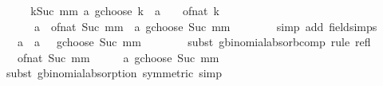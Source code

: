 \begin{isabellebody}
\ \ \isamarkupfalse%
\ \isamarkupfalse%
\ {\isachardoublequoteopen}{\isacharparenleft}{\kern0pt}{\isasymSum}k{\isasymle}Suc\ mm{\isachardot}{\kern0pt}\ {\isacharparenleft}{\kern0pt}a\ gchoose\ k{\isacharparenright}{\kern0pt}\ {\isacharasterisk}{\kern0pt}\ {\isacharparenleft}{\kern0pt}a\ {\isacharslash}{\kern0pt}\ {}\ {\isacharminus}{\kern0pt}\ of{\isacharunderscore}{\kern0pt}nat\ k{\isacharparenright}{\kern0pt}{\isacharparenright}{\kern0pt}\ {\isacharequal}{\kern0pt}\isanewline
\ \ \ \ \ \ {\isacharparenleft}{\kern0pt}a\ {\isacharminus}{\kern0pt}\ of{\isacharunderscore}{\kern0pt}nat\ {\isacharparenleft}{\kern0pt}Suc\ mm{\isacharparenright}{\kern0pt}{\isacharparenright}{\kern0pt}\ {\isacharasterisk}{\kern0pt}\ {\isacharparenleft}{\kern0pt}a\ gchoose\ Suc\ mm{\isacharparenright}{\kern0pt}\ {\isacharslash}{\kern0pt}\ {}{\isachardoublequoteclose}\isanewline
\ \ \ \ \isamarkupfalse%
\ {\isacharparenleft}{\kern0pt}simp\ add{\isacharcolon}{\kern0pt}\ field{\isacharunderscore}{\kern0pt}simps{\isacharparenright}{\kern0pt}\isanewline
\ \ \isamarkupfalse%
\ \isamarkupfalse%
\ {\isachardoublequoteopen}{\isasymdots}\ {\isacharequal}{\kern0pt}\ a\ {\isacharasterisk}{\kern0pt}\ {\isacharparenleft}{\kern0pt}a\ {\isacharminus}{\kern0pt}\ {}\ gchoose\ Suc\ mm{\isacharparenright}{\kern0pt}\ {\isacharslash}{\kern0pt}\ {}{\isachardoublequoteclose}\isanewline
\ \ \ \ \isamarkupfalse%
\ {\isacharparenleft}{\kern0pt}subst\ gbinomial{\isacharunderscore}{\kern0pt}absorb{\isacharunderscore}{\kern0pt}comp{\isacharparenright}{\kern0pt}\ {\isacharparenleft}{\kern0pt}rule\ refl{\isacharparenright}{\kern0pt}\isanewline
\ \ \isamarkupfalse%
\ \isamarkupfalse%
\ {\isachardoublequoteopen}{\isasymdots}\ {\isacharequal}{\kern0pt}\ {\isacharparenleft}{\kern0pt}of{\isacharunderscore}{\kern0pt}nat\ {\isacharparenleft}{\kern0pt}Suc\ mm{\isacharparenright}{\kern0pt}\ {\isacharplus}{\kern0pt}\ {}{\isacharparenright}{\kern0pt}\ {\isacharslash}{\kern0pt}\ {}\ {\isacharasterisk}{\kern0pt}\ {\isacharparenleft}{\kern0pt}a\ gchoose\ {\isacharparenleft}{\kern0pt}Suc\ mm\ {\isacharplus}{\kern0pt}\ {}{\isacharparenright}{\kern0pt}{\isacharparenright}{\kern0pt}{\isachardoublequoteclose}\isanewline
\ \ \ \ \isamarkupfalse%
\ {\isacharparenleft}{\kern0pt}subst\ gbinomial{\isacharunderscore}{\kern0pt}absorption\ {\isacharbrackleft}{\kern0pt}symmetric{\isacharbrackright}{\kern0pt}{\isacharparenright}{\kern0pt}\ simp\isanewline

\end{isabellebody}
